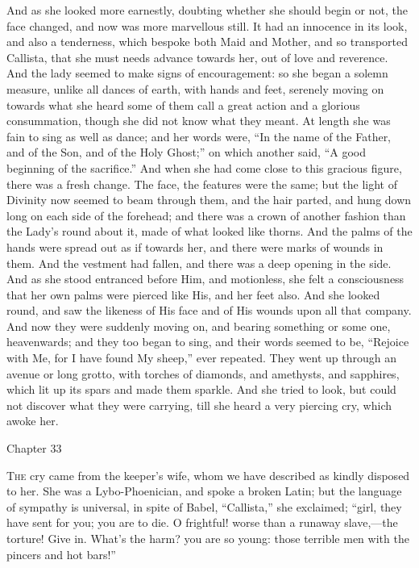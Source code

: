 And as she looked more earnestly, doubting whether she should begin
or not, the face changed, and now was more marvellous still. It had an
innocence in its look, and also a tenderness, which bespoke both Maid
and Mother, and so transported Callista, that she must needs advance
towards her, out of love and reverence. And the lady seemed to make
signs of encouragement: so she began a solemn measure, unlike all
dances of earth, with hands and feet, serenely moving on towards what
she heard some of them call a great action and a glorious
consummation, though she did not know what they meant. At length she
was fain to sing as well as dance; and her words were, ``In the
name of the Father, and of the Son, and of the Holy Ghost;'' on
which another said, ``A good beginning of the sacrifice.'' And
when she had come close to this gracious figure, there was a fresh
change. The face, the features were the same; but the light of
Divinity now seemed to beam through them, and the hair parted, and
hung down long on each side of the forehead; and there was a crown of
another fashion than the Lady's round about it, made of what looked
like thorns. And the palms of the hands were spread out as if towards
her, and there were marks of wounds in them. And the vestment
had fallen, and there was a deep opening in the side. And as she stood
entranced before Him, and motionless, she felt a consciousness that
her own palms were pierced like His, and her feet also. And she looked
round, and saw the likeness of His face and of His wounds upon all
that company. And now they were suddenly moving on, and bearing
something or some one, heavenwards; and they too began to sing, and
their words seemed to be, ``Rejoice with Me, for I have found My
sheep,'' ever repeated. They went up through an avenue or long
grotto, with torches of diamonds, and amethysts, and sapphires, which
lit up its spars and made them sparkle. And she tried to look, but
could not discover what they were carrying, till she heard a very
piercing cry, which awoke her.

Chapter 33


T\textsc{he} cry came from the keeper's wife, whom we have described
as kindly disposed to her. She was a Lybo-Phoenician, and spoke a
broken Latin; but the language of sympathy is universal, in spite of
Babel, ``Callista,'' she exclaimed; ``girl, they have sent
for you; you are to die. O frightful! worse than a runaway slave,—the
torture! Give in. What's the harm? you are so young: those terrible
men with the pincers and hot bars!''


